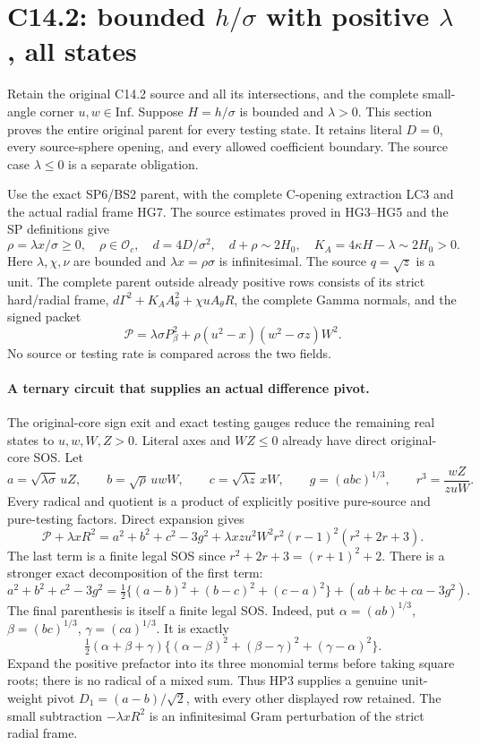 \section{C14.2: bounded $h/\sigma$ with positive $\lambda$, all states}
\label{sec:r19-c142-positive-lambda}

Retain the original C14.2 source and all its intersections, and the
complete small-angle corner $u,w\in\mathrm{Inf}$.  Suppose
$H=h/\sigma$ is bounded and $\lambda>0$.  This section proves the
entire original parent for every testing state.  It retains literal
$D=0$, every source-sphere opening, and every allowed coefficient
boundary.  The source case $\lambda\le0$ is a separate obligation.

Use the exact SP6/BS2 parent, with the complete C-opening extraction
LC3 and the actual radial frame HG7.  The source estimates proved
in HG3--HG5 and the SP definitions give
\[
 \rho=\lambda x/\sigma\ge0,\quad \rho\in\mathcal O_c,
 \quad d=4D/\sigma^2,\quad
 d+\rho\sim2H_0,
 \quad K_A=4\kappa H-\lambda\sim2H_0>0.
 \tag{HP1}
\]
Here $\lambda,\chi,\nu$ are bounded and $\lambda x=\rho\sigma$
is infinitesimal.  The source $q=\sqrt z$ is a unit.  The complete
parent outside already positive rows consists of its strict hard/radial
frame, $d\Gamma^2+K_A A_\theta^2+\chi uA_\theta R$, the complete
Gamma normals, and the signed packet
\[
 \mathscr P=\lambda\sigma P_\beta^2+
      \rho(u^2-x)(w^2-\sigma z)W^2.
 \tag{HP2}
\]
No source or testing rate is compared across the two fields.

\paragraph{A ternary circuit that supplies an actual difference pivot.}
The original-core sign exit and exact testing gauges reduce the
remaining real states to $u,w,W,Z>0$.  Literal axes and $WZ\le0$
already have direct original-core SOS.  Let
\[
 a=\sqrt{\lambda\sigma}\,uZ,\qquad
 b=\sqrt\rho\,uwW,\qquad
 c=\sqrt{\lambda z}\,xW,\qquad g=(abc)^{1/3},
 \qquad r^3=\frac{wZ}{zuW}.
\]
Every radical and quotient is a product of explicitly positive
pure-source and pure-testing factors.  Direct expansion gives
\[
 \boxed{\quad
 \mathscr P+\lambda xR^2
 =a^2+b^2+c^2-3g^2
  +\lambda xzu^2W^2 r^2(r-1)^2(r^2+2r+3).
 \quad} \tag{HP3}
\]
The last term is a finite legal SOS since $r^2+2r+3=(r+1)^2+2$.
There is a stronger exact decomposition of the first term:
\[
 a^2+b^2+c^2-3g^2
 =\tfrac12\{(a-b)^2+(b-c)^2+(c-a)^2\}
       +(ab+bc+ca-3g^2).
 \tag{HP4}
\]
The final parenthesis is itself a finite legal SOS.  Indeed, put
$\alpha=(ab)^{1/3}$, $\beta=(bc)^{1/3}$,
$\gamma=(ca)^{1/3}$.  It is exactly
\[
 \tfrac12(\alpha+\beta+\gamma)
    \{(\alpha-\beta)^2+(\beta-\gamma)^2+(\gamma-\alpha)^2\}.
 \tag{HP5}
\]
Expand the positive prefactor into its three monomial terms before
taking square roots; there is no radical of a mixed sum.  Thus HP3
supplies a genuine unit-weight pivot
$D_1=(a-b)/\sqrt2$, with every other displayed row retained.
The small subtraction $-\lambda xR^2$ is an infinitesimal Gram
perturbation of the strict radial frame.

